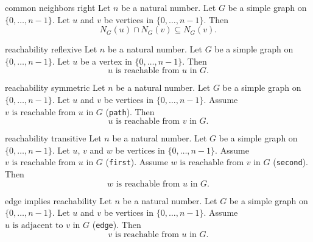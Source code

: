 \begin{cleanresult}{common neighbors right}
Let $n$ be a natural number.
Let $G$ be a simple graph on $\{0,\ldots,n-1\}$.
Let $u$ and $v$ be vertices in $\{0,\ldots,n-1\}$.
Then \[N_{G}(u)\cap N_{G}(v)\subseteq N_{G}(v).\]
\end{cleanresult}

\begin{cleanresult}{reachability reflexive}
Let $n$ be a natural number.
Let $G$ be a simple graph on $\{0,\ldots,n-1\}$.
Let $u$ be a vertex in $\{0,\ldots,n-1\}$.
Then \[u\text{ is reachable from }u\text{ in }G.\]
\end{cleanresult}

\begin{cleanresult}{reachability symmetric}
Let $n$ be a natural number.
Let $G$ be a simple graph on $\{0,\ldots,n-1\}$.
Let $u$ and $v$ be vertices in $\{0,\ldots,n-1\}$.
Assume $v\text{ is reachable from }u\text{ in }G$ (\texttt{path}).
Then \[u\text{ is reachable from }v\text{ in }G.\]
\end{cleanresult}

\begin{cleanresult}{reachability transitive}
Let $n$ be a natural number.
Let $G$ be a simple graph on $\{0,\ldots,n-1\}$.
Let $u$, $v$ and $w$ be vertices in $\{0,\ldots,n-1\}$.
Assume $v\text{ is reachable from }u\text{ in }G$ (\texttt{first}).
Assume $w\text{ is reachable from }v\text{ in }G$ (\texttt{second}).
Then \[w\text{ is reachable from }u\text{ in }G.\]
\end{cleanresult}

\begin{cleanresult}{edge implies reachability}
Let $n$ be a natural number.
Let $G$ be a simple graph on $\{0,\ldots,n-1\}$.
Let $u$ and $v$ be vertices in $\{0,\ldots,n-1\}$.
Assume $u\text{ is adjacent to }v\text{ in }G$ (\texttt{edge}).
Then \[v\text{ is reachable from }u\text{ in }G.\]
\end{cleanresult}

